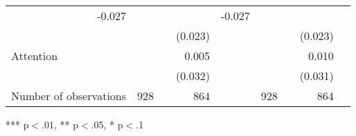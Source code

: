\documentclass{article}
\begin{document}
\begin{table}[!h]
\begin{tabular}{lllllllll}
  \multicolumn{1}{r}{-0.027} &
  \multicolumn{1}{l}{} &
  \multicolumn{1}{r}{} &
  \multicolumn{1}{l}{} &
  \multicolumn{1}{r}{-0.027} &
  \multicolumn{1}{l}{} \\
\multicolumn{1}{l}{} &
  \multicolumn{1}{r}{} &
  \multicolumn{1}{l}{} &
  \multicolumn{1}{r}{(0.023)} &
  \multicolumn{1}{l}{} &
  \multicolumn{1}{r}{} &
  \multicolumn{1}{l}{} &
  \multicolumn{1}{r}{(0.023)} &
  \multicolumn{1}{l}{} \\
\multicolumn{1}{l}{Attention} &
  \multicolumn{1}{r}{} &
  \multicolumn{1}{l}{} &
  \multicolumn{1}{r}{0.005} &
  \multicolumn{1}{l}{} &
  \multicolumn{1}{r}{} &
  \multicolumn{1}{l}{} &
  \multicolumn{1}{r}{0.010} &
  \multicolumn{1}{l}{} \\
\multicolumn{1}{l}{} &
  \multicolumn{1}{r}{} &
  \multicolumn{1}{l}{} &
  \multicolumn{1}{r}{(0.032)} &
  \multicolumn{1}{l}{} &
  \multicolumn{1}{r}{} &
  \multicolumn{1}{l}{} &
  \multicolumn{1}{r}{(0.031)} &
  \multicolumn{1}{l}{} \\
\multicolumn{1}{l}{Number of observations} &
  \multicolumn{1}{r}{928} &
  \multicolumn{1}{l}{} &
  \multicolumn{1}{r}{864} &
  \multicolumn{1}{l}{} &
  \multicolumn{1}{r}{928} &
  \multicolumn{1}{l}{} &
  \multicolumn{1}{r}{864} &
  \multicolumn{1}{l}{} \\
\cline{1-9}
\end{tabular}

\footnotesize{
*** p$<$.01, ** p$<$.05, * p$<$.1
}
\end{table}
\end{document}
